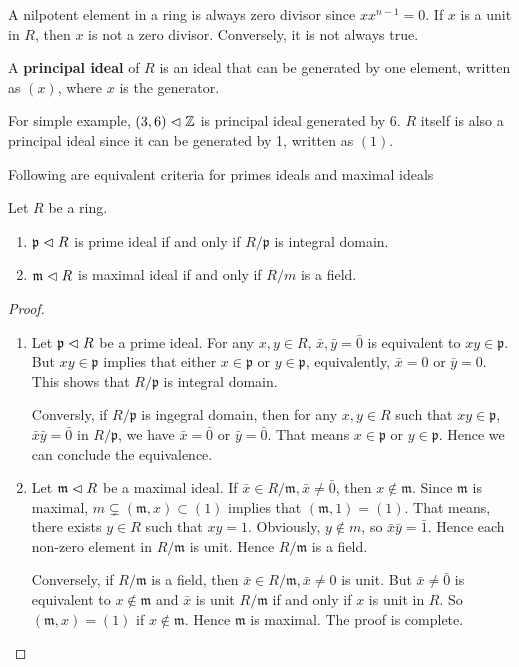 \documentclass{amsart}
\begin{document}
\begin{rem}
	A nilpotent element in a ring is always zero divisor since $x x^{n-1}=0$. If $x$ is a unit in $R$, then $x$ is not a zero divisor. Conversely, it is not always true.
\end{rem}

\begin{secdefn}
	A \textbf{principal ideal} of $R$ is an ideal that can be generated by one element, written as $(x)$, where $x$ is the generator.
\end{secdefn}
For simple example, $(3,6) \vartriangleleft \mathbb{Z}$ is principal ideal generated by 6. $R$ itself is also a principal ideal since it can be generated by 1, written as $(1)$.

Following are equivalent criteria for primes ideals and maximal ideals
\begin{secprop}
	Let $R$ be a ring.
	\begin{enumerate}
		\item $\mathfrak{p} \vartriangleleft R$ is prime ideal if and only if $R/\mathfrak{p}$ is integral domain.
		\item $\mathfrak{m} \vartriangleleft R$ is maximal ideal if and only if $R/m$ is a field.
	\end{enumerate}
\end{secprop}
\begin{proof}
	\begin{enumerate}
		\item Let $\mathfrak{p} \vartriangleleft R$ be a prime ideal. For any $x,y \in R$, $\bar{x},\bar{y} = \bar{0}$ is equivalent to $xy \in \mathfrak{p}$. But $xy \in \mathfrak{p}$ implies that either $x \in \mathfrak{p}$ or $y \in \mathfrak{p}$, equivalently, $\bar{x}=0$ or $\bar{y}=0$. This shows that $R/\mathfrak{p}$ is integral domain. 
		
		Conversly, if $R/\mathfrak{p}$ is ingegral domain, then for any $x,y \in R$ such that $xy \in \mathfrak{p}$, $\bar{x} \bar{y} = \bar{0}$ in $R/\mathfrak{p}$, we have $\bar{x}=\bar{0}$ or $\bar{y} = \bar{0}$. That means $x \in \mathfrak{p}$ or $y \in \mathfrak{p}$. Hence we can conclude the equivalence.
		\item Let $\mathfrak{m} \vartriangleleft R$ be a maximal ideal. If $ \bar{x} \in R/\mathfrak{m}, \bar{x} \neq \bar{0}$, then $x \notin \mathfrak{m}$. Since $\mathfrak{m}$ is maximal, $m \subsetneq (\mathfrak{m}, x) \subset (1)$ implies that $(\mathfrak{m},1) = (1)$. That means, there exists $y \in R$ such that $xy =1 $. Obviously, $y \notin m$, so $\bar{x} \bar{y} = \bar{1}$. Hence each non-zero element in $R/\mathfrak{m}$ is unit. Hence $R/\mathfrak{m}$ is a field.
		
		Conversely, if $R/\mathfrak{m}$ is a field, then $\bar{x} \in R/\mathfrak{m}, \bar{x} \neq 0$ is unit. But $\bar{x} \neq \bar{0}$ is equivalent to $x \notin \mathfrak{m}$ and $\bar{x}$ is unit $R/\mathfrak{m}$ if and only if $x$ is unit in $R$. So $(\mathfrak{m}, x) = (1)$ if $x \notin \mathfrak{m}$. Hence $\mathfrak{m}$ is maximal. The proof is complete. 
	\end{enumerate}
\end{proof}
\end{document}

